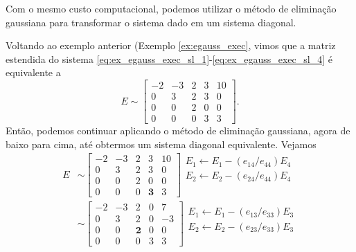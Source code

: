 Com o mesmo custo computacional, podemos utilizar o método de eliminação gaussiana para transformar o sistema dado em um sistema diagonal.

\begin{ex}\label{ex:egauss_reduzida}
  Voltando ao exemplo anterior (Exemplo \ref{ex:egauss_exec}, vimos que a matriz estendida do sistema \eqref{eq:ex_egauss_exec_sl_1}-\eqref{eq:ex_egauss_exec_sl_4} é equivalente a
  \begin{equation}
    E \sim       
    \begin{bmatrix}
        -2 & -3 & 2 & 3 & 10\\
        0 & 3 & 2 & 3 & 0\\
        0 & 0 & 2 & 0 & 0\\
        0 & 0 & 0 & 3 & 3
      \end{bmatrix}.
  \end{equation}
Então, podemos continuar aplicando o método de eliminação gaussiana, agora de baixo para cima, até obtermos um sistema diagonal equivalente. Vejamos
\begin{align}
  E &\sim       
      \begin{bmatrix}
        -2 & -3 & 2 & 3 & 10\\
        0 & 3 & 2 & 3 & 0\\
        0 & 0 & 2 & 0 & 0\\
        0 & 0 & 0 & \pmb{3} & 3
      \end{bmatrix}
      \begin{array}{l}
      E_1 \leftarrow E_1 - (e_{14}/e_{44})E_4\\
      E_2 \leftarrow E_2 - (e_{24}/e_{44})E_4\\
      \\
      \\
    \end{array}\\
    &\sim       
      \begin{bmatrix}
        -2 & -3 & 2 & 0 & 7\\
        0 & 3 & 2 & 0 & -3\\
        0 & 0 & \pmb{2} & 0 & 0\\
        0 & 0 & 0 & 3 & 3
      \end{bmatrix}
      \begin{array}{l}
      E_1 \leftarrow E_1 - (e_{13}/e_{33})E_3\\
      E_2 \leftarrow E_2 - (e_{23}/e_{33})E_3\\
      \\

\end{array}
\end{align}
\end{ex}

